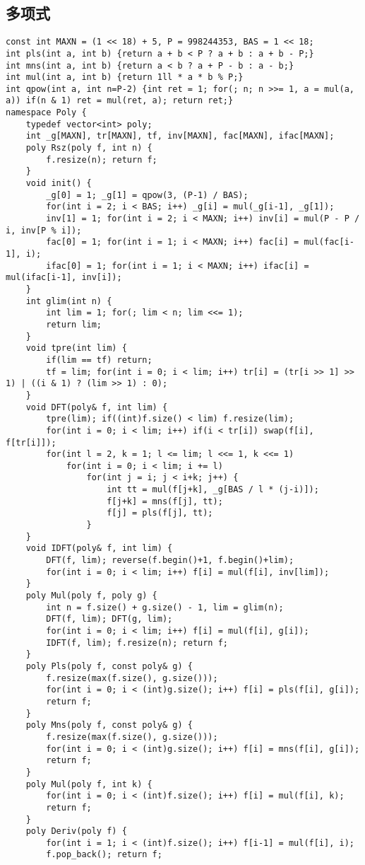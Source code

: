 \documentclass{article}
\begin{document}
   \subsection{多项式}

\begin{lstlisting}
const int MAXN = (1 << 18) + 5, P = 998244353, BAS = 1 << 18;
int pls(int a, int b) {return a + b < P ? a + b : a + b - P;}
int mns(int a, int b) {return a < b ? a + P - b : a - b;}
int mul(int a, int b) {return 1ll * a * b % P;}
int qpow(int a, int n=P-2) {int ret = 1; for(; n; n >>= 1, a = mul(a, a)) if(n & 1) ret = mul(ret, a); return ret;}
namespace Poly {
	typedef vector<int> poly;
	int _g[MAXN], tr[MAXN], tf, inv[MAXN], fac[MAXN], ifac[MAXN];
	poly Rsz(poly f, int n) {
		f.resize(n); return f;
	}
	void init() {
		_g[0] = 1; _g[1] = qpow(3, (P-1) / BAS);
		for(int i = 2; i < BAS; i++) _g[i] = mul(_g[i-1], _g[1]);
		inv[1] = 1; for(int i = 2; i < MAXN; i++) inv[i] = mul(P - P / i, inv[P % i]);
		fac[0] = 1; for(int i = 1; i < MAXN; i++) fac[i] = mul(fac[i-1], i);
		ifac[0] = 1; for(int i = 1; i < MAXN; i++) ifac[i] = mul(ifac[i-1], inv[i]);
	}
	int glim(int n) {
		int lim = 1; for(; lim < n; lim <<= 1);
		return lim;
	}
	void tpre(int lim) {
		if(lim == tf) return;
		tf = lim; for(int i = 0; i < lim; i++) tr[i] = (tr[i >> 1] >> 1) | ((i & 1) ? (lim >> 1) : 0);
	}
	void DFT(poly& f, int lim) {
		tpre(lim); if((int)f.size() < lim) f.resize(lim);
		for(int i = 0; i < lim; i++) if(i < tr[i]) swap(f[i], f[tr[i]]);
		for(int l = 2, k = 1; l <= lim; l <<= 1, k <<= 1)
			for(int i = 0; i < lim; i += l)
				for(int j = i; j < i+k; j++) {
					int tt = mul(f[j+k], _g[BAS / l * (j-i)]);
					f[j+k] = mns(f[j], tt);
					f[j] = pls(f[j], tt);
				}
	}
	void IDFT(poly& f, int lim) {
		DFT(f, lim); reverse(f.begin()+1, f.begin()+lim);
		for(int i = 0; i < lim; i++) f[i] = mul(f[i], inv[lim]);
	}
	poly Mul(poly f, poly g) {
		int n = f.size() + g.size() - 1, lim = glim(n);
		DFT(f, lim); DFT(g, lim);
		for(int i = 0; i < lim; i++) f[i] = mul(f[i], g[i]);
		IDFT(f, lim); f.resize(n); return f;
	}
	poly Pls(poly f, const poly& g) {
		f.resize(max(f.size(), g.size()));
		for(int i = 0; i < (int)g.size(); i++) f[i] = pls(f[i], g[i]);
		return f;
	}
	poly Mns(poly f, const poly& g) {
		f.resize(max(f.size(), g.size()));
		for(int i = 0; i < (int)g.size(); i++) f[i] = mns(f[i], g[i]);
		return f;
	}
	poly Mul(poly f, int k) {
		for(int i = 0; i < (int)f.size(); i++) f[i] = mul(f[i], k);
		return f;
	}
	poly Deriv(poly f) {
		for(int i = 1; i < (int)f.size(); i++) f[i-1] = mul(f[i], i);
		f.pop_back(); return f;

\end{lstlisting}
\end{document}
